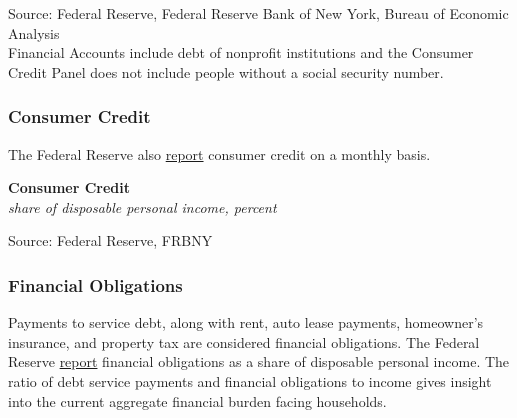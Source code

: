 \documentclass{report}
\makeatletter
\newcommand{\tbllink}[1]{\href{https://raw.githubusercontent.com/bdecon/US-chartbook/master/chartbook/data/#1}{\faTable}}
\newcommand*\short[1]{\expandafter\@gobbletwo\number\numexpr#1\relax}
\newcommand{\absnode}[3]{\node[below right, align=left] at (axis cs: #1,#2) {#3};}
\newcommand{\dateaxisticks}{
		date coordinates in=x, axis line style={draw=none},
		xmax={2023-11-30},
		max space between ticks=40,	    
		xtick={{1990-01-01}, {1992-01-01}, {1994-01-01}, 
			{1996-01-01}, {1998-01-01}, {2000-01-01}, 
			{2002-01-01}, {2004-01-01}, {2006-01-01},
			{2008-01-01}, {2010-01-01}, {2012-01-01}, {2014-01-01},
		    {2016-01-01}, {2018-01-01}, {2020-01-01}, {2022-01-01}, 
		    {2024-01-01}, {2026-01-01}},
		minor xtick={{1989-01-01}, {1991-01-01}, {1993-01-01},
			{1995-01-01}, {1997-01-01}, {1999-01-01}, 
			{2001-01-01}, {2003-01-01}, {2005-01-01}, {2007-01-01},
		    {2009-01-01}, {2011-01-01}, {2013-01-01}, {2015-01-01},
		    {2017-01-01}, {2019-01-01}, {2021-01-01}, {2023-01-01}, 
		    {2025-01-01}, {2027-01-01}},
		enlarge y limits={0.06}, enlarge x limits={0.01},
		xticklabel style={align=center, yshift=-2pt}, tick label style={inner sep=0pt},
		}
\newcommand{\bbar}[2]{extra #1 ticks = {{#2}}, extra #1 tick labels = ,
		extra #1 tick style = {grid=major, grid style={thick, black!25}},}
\newcommand{\stdline}[4]{\addplot[very thick, no markers, color=#1] 
		table [x=#2, y=#3, col sep=comma] {#4};	}
\newcommand{\thickline}[4]{\addplot[ultra thick, no markers, color=#1] 
		table [x=#2, y=#3, col sep=comma] {#4};	}
\newcommand{\rbars}{
		\fill[color=black!10] (axis cs:{1990-07-01},\pgfkeysvalueof{/pgfplots/ymin}) rectangle 
			(axis cs:{1991-03-01}, \pgfkeysvalueof{/pgfplots/ymax});
		\fill[color=black!10] (axis cs:{2007-12-01},\pgfkeysvalueof{/pgfplots/ymin}) rectangle 
			(axis cs:{2009-07-01}, \pgfkeysvalueof{/pgfplots/ymax});
		\fill[color=black!10] (axis cs:{2001-03-01},\pgfkeysvalueof{/pgfplots/ymin}) rectangle 
			(axis cs:{2001-11-01}, \pgfkeysvalueof{/pgfplots/ymax});
		\fill[color=black!10] (axis cs:{2020-02-01},\pgfkeysvalueof{/pgfplots/ymin}) rectangle 
			(axis cs:{2020-05-01}, \pgfkeysvalueof{/pgfplots/ymax});}
\makeatother
\begin{document}
{\begin{minipage}{0.76\textwidth}
\footnotesize{Source: Federal Reserve, Federal Reserve Bank of New York, Bureau of Economic Analysis}\\
\footnotesize{Financial Accounts include debt of nonprofit institutions and the Consumer Credit Panel does not include people without a social security number.}
\end{minipage}
\newpage
\vspace*{-10mm}

\begin{minipage}{0.76\textwidth}  
\subsubsection*{Consumer Credit}

\small The Federal Reserve also \href{https://www.federalreserve.gov/releases/g19/current/default.htm}{report} consumer credit on a monthly basis. 



\normalsize \textbf{Consumer Credit}\\
\footnotesize{\textit{share of disposable personal income, percent}}
\vspace{3.3cm}

\hspace{3mm} 

\footnotesize{Source: Federal Reserve, FRBNY} \hfill \tbllink{cc_dpi_monthly.csv} \tbllink{hhcdebt.csv}
\vspace{3mm}
\subsubsection*{Financial Obligations}  
\small Payments to service debt, along with rent, auto lease payments, homeowner's insurance, and property tax are considered financial obligations. The Federal Reserve \href{https://www.federalreserve.gov/releases/housedebt/default.htm}{report} financial obligations as a share of disposable personal income. The ratio of debt service payments and financial obligations to income gives insight into the current aggregate financial burden facing households. 
\end{minipage}

}
\end{document}
